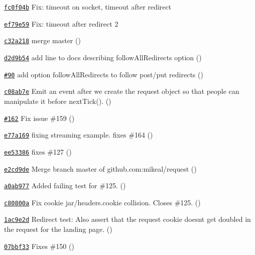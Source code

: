 \begin{DoxyItemize}
\item \href{https://github.com/mikeal/request/commit/fc0f04bab5d6be56a2c19d47d3e8386bd9a0b29e}{\tt fc0f04b} Fix\+: timeout on socket, timeout after redirect
\item \href{https://github.com/mikeal/request/commit/ef79e59bbb88ed3e7d4368fe3ca5eee411bda345}{\tt ef79e59} Fix\+: timeout after redirect 2
\item \href{https://github.com/mikeal/request/commit/c32a218da2296e89a269f1832d95b12c4aa10852}{\tt c32a218} merge master ()
\item \href{https://github.com/mikeal/request/commit/d2d9b545e5679b829d33deeba0b22f9050fd78b1}{\tt d2d9b54} add line to docs describing follow\+All\+Redirects option ()
\item \href{https://github.com/mikeal/request/pull/90}{\tt \#90} add option follow\+All\+Redirects to follow post/put redirects ()
\item \href{https://github.com/mikeal/request/commit/c08ab7efaefd39c04deb6986716efe5a6069528e}{\tt c08ab7e} Emit an event after we create the request object so that people can manipulate it before next\+Tick(). ()
\item \href{https://github.com/mikeal/request/pull/162}{\tt \#162} Fix issue \#159 ()
\item \href{https://github.com/mikeal/request/commit/e77a1695c5c632c067857e99274f28a1d74301fe}{\tt e77a169} fixing streaming example. fixes \#164 ()
\item \href{https://github.com/mikeal/request/commit/ee53386d85975c79b801edbb4f5bb7ff4c5dc90b}{\tt ee53386} fixes \#127 ()
\item \href{https://github.com/mikeal/request/commit/e2cd9de9a9d10e1aa4cf4e26006bb30fa5086f0b}{\tt e2cd9de} Merge branch \textquotesingle{}master\textquotesingle{} of github.\+com\+:mikeal/request ()
\item \href{https://github.com/mikeal/request/commit/a0ab9770a8fb89f970bb3783ed4e6dde9e33511b}{\tt a0ab977} Added failing test for \#125. ()
\item \href{https://github.com/mikeal/request/commit/c80800a834b0f8bc0fb40d1fad4d4165a83369fd}{\tt c80800a} Fix cookie jar/headers.\+cookie collision. Closes \#125. ()
\item \href{https://github.com/mikeal/request/commit/1ac9e2d1bf776728a1fe676dd3693ef66f50f7f7}{\tt 1ac9e2d} Redirect test\+: Also assert that the request cookie doesn\textquotesingle{}t get doubled in the request for the landing page. ()
\item \href{https://github.com/mikeal/request/commit/07bbf331e2a0d40d261487f6222e8cafee0e50e3}{\tt 07bbf33} Fixes \#150 ()

\end{DoxyItemize}
